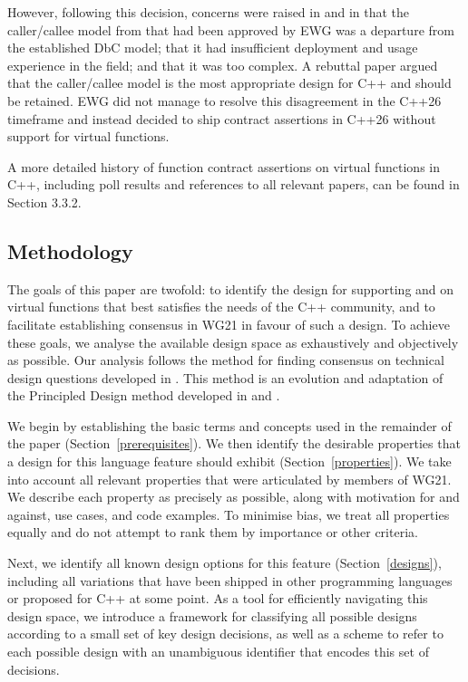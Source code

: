 However, following this decision, concerns were raised in \cite{P3506R0} and in \cite{P3573R0} that the caller/callee model from \cite{P3097R0} that had been approved by EWG was a departure from the established DbC model; that it had insufficient deployment and usage experience in the field; and that it was too complex. A rebuttal paper \cite{P3506R0} argued that the caller/callee model is the most appropriate design for C++ and should be retained. EWG did not manage to resolve this disagreement in the C++26 timeframe and instead decided to ship contract assertions in C++26 without support for virtual functions.

A more detailed history of function contract assertions on virtual functions in C++, including poll results and references to all relevant papers, can be found in \cite{P2899R1} Section 3.3.2.

\subsection{Methodology}

The goals of this paper are twofold: to identify the design for supporting  and  on virtual functions that best satisfies the needs of the C++ community, and to facilitate establishing consensus in WG21 in favour of such a design. To achieve these goals, we analyse the available design space as exhaustively and objectively as possible. Our analysis follows the method for finding consensus on technical design questions developed in \cite{P3099R0}. This method is an evolution and adaptation of the Principled Design method developed in \cite{P3004R0} and \cite{P3005R0}.

We begin by establishing the basic terms and concepts used in the remainder of the paper (Section~\ref{prerequisites}). We then identify the desirable properties that a design for this language feature should exhibit (Section~\ref{properties}). We take into account all relevant properties that were articulated by members of WG21. We describe each property as precisely as possible, along with motivation for and against, use cases, and code examples. To minimise bias, we treat all properties equally and do not attempt to rank them by importance or other criteria.

Next, we identify all known design options for this feature (Section~\ref{designs}), including all variations that have been shipped in other programming languages or proposed for C++ at some point. As a tool for efficiently navigating this design space, we introduce a framework for classifying all possible designs according to a small set of key design decisions, as well as a scheme to refer to each possible design with an unambiguous identifier that encodes this set of decisions.

